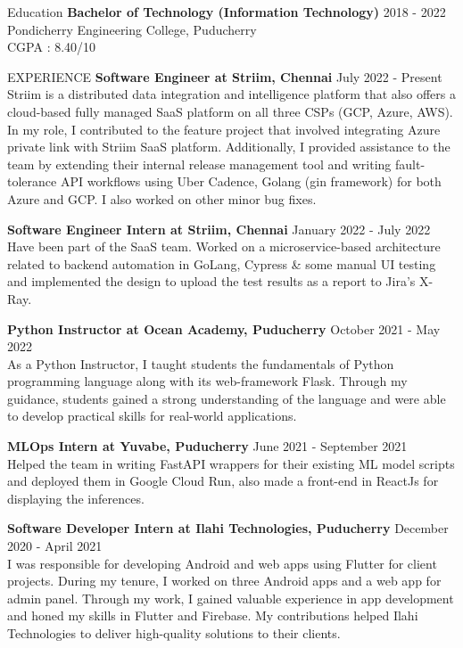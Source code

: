\documentclass{template}
\begin{document}
\begin{rSection}{Education}
{\bf Bachelor of Technology (Information Technology)} \hfill {2018 - 2022}
\\ 
Pondicherry Engineering College, Puducherry \\
CGPA : 8.40/10


\end{rSection}

\begin{rSection}{EXPERIENCE}
\textbf{Software Engineer at Striim, Chennai} \hfill July 2022 - Present \\
Striim is a distributed data integration and intelligence platform that also offers a cloud-based fully managed SaaS platform on all three CSPs (GCP, Azure, AWS). In my role, I  contributed to the feature project that involved integrating Azure private link with Striim SaaS platform. Additionally, I provided assistance to the team by extending their internal release management tool and writing fault-tolerance API workflows using Uber Cadence, Golang (gin framework) for both Azure and GCP. I also worked on other minor bug fixes.

\textbf{Software Engineer Intern at Striim, Chennai} \hfill January 2022 - July 2022 \\
Have been part of the SaaS team. Worked on a microservice-based architecture related to backend automation in GoLang, Cypress \& some manual UI testing and implemented the design to upload the test results as a report to Jira's X-Ray.

\textbf{Python Instructor at Ocean Academy, Puducherry} \hfill October 2021 - May 2022 \\
As a Python Instructor, I taught students the fundamentals of Python programming language along with its web-framework Flask. Through my guidance, students gained a strong understanding of the language and were able to develop practical skills for real-world applications.

\textbf{MLOps Intern at Yuvabe, Puducherry} \hfill June 2021 - September 2021 \\
Helped the team in writing FastAPI wrappers for their existing ML model scripts and deployed them in Google Cloud Run, also made a front-end in ReactJs for displaying the inferences.

\textbf{Software Developer Intern at Ilahi Technologies, Puducherry} \hfill December 2020 - April 2021 \\
I was responsible for developing Android and web apps using Flutter for client projects. During my tenure, I worked on three Android apps and a web app for admin panel. Through my work, I gained valuable experience in app development and honed my skills in Flutter and Firebase. My contributions helped Ilahi Technologies to deliver high-quality solutions to their clients.

\end{rSection} 
\end{document}
